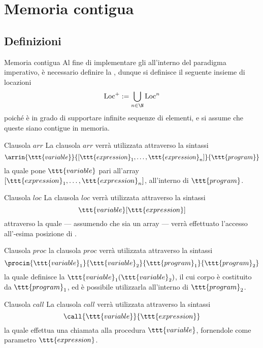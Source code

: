 \documentclass[a4paper, 12pt]{report}
\begin{document}
    \section{Memoria contigua}

    \subsection{Definizioni}

    \begin{frameddefn}{Memoria contigua}
        Al fine di implementare gli  all'interno del paradigma imperativo, è necessario definire la , dunque si definisce il seguente insieme di locazioni $$\displaystyle \mathrm{Loc}^+ := \bigcup_{n \in \N}{\mathrm{Loc}^n}$$ poiché è in grado di supportare infinite sequenze di elementi, e si assume che queste siano contigue in memoria.
    \end{frameddefn}

    \begin{frameddefn}{Clausola $arr$}
        La clausola $arr$ verrà utilizzata attraverso la sintassi $$\arrin{\ttt{variable}}{[\ttt{expression}_1, \ldots, \ttt{expression}_n]}{\ttt{program}}$$ la quale pone $\ttt{variable}$ pari all'array $[\ttt{expression}_1, \ldots, \ttt{expression}_n]$, all'interno di $\ttt{program}$.
    \end{frameddefn}

    \begin{frameddefn}{Clausola $loc$}
        La clausola $loc$ verrà utilizzata attraverso la sintassi $$\ttt{variable}[\ttt{expression}]$$ attraverso la quale --- assumendo che  sia un array --- verrà effettuato l'accesso all'-esima posizione di .
    \end{frameddefn}

    \begin{frameddefn}{Clausola $proc$}
        la clausola $proc$ verrà utilizzata attraverso la sintassi $$\procin{\ttt{variable}_1}{\ttt{variable}_2}{\ttt{program}_1}{\ttt{program}_2}$$ la quale definisce la  $\ttt{variable}_1(\ttt{variable}_2)$, il cui corpo è costituito da $\ttt{program}_1$, ed è possibile utilizzarla all'interno di $\ttt{program}_2$.
    \end{frameddefn}

    \begin{frameddefn}{Clausola $call$}
        La clausola $call$ verrà utilizzata attraverso la sintassi $$\call{\ttt{variable}}{\ttt{expression}}$$ la quale effettua una chiamata alla procedura $\ttt{variable}$, fornendole come parametro $\ttt{expression}$.
    \end{frameddefn}
\end{document}
